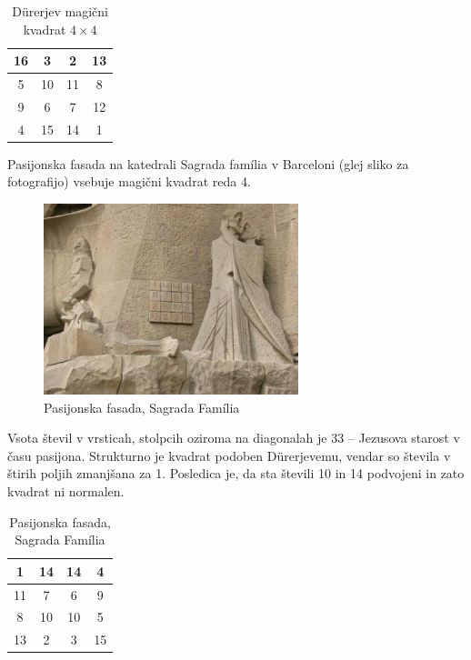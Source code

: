 \documentclass[a4paper,12pt]{article}
\theoremstyle{plain}
\theoremstyle{definition}
\theoremstyle{proof}
\begin{document}
\begin{table} [htp]
   \caption{Dürerjev magični kvadrat $4\times 4$}
   \centering
   \large
   
\begin{tabular}{|c|c|c|c|}
\hline
16 &  3 &  2 & 13 \\\hline
5 & 10 & 11 &  8 \\\hline
9 &  6 &  7 & 12 \\\hline
 4 & 15 & 14 &  1 \\\hline
\end{tabular}
\label{table:durer}
\end{table}



Pasijonska fasada na katedrali Sagrada família v Barceloni
(glej sliko \cite{fig:sagrada} za fotografijo) vsebuje magični kvadrat reda 4.

\begin{figure}[!ht]
   \centering
   \includegraphics{sagrada.png}
   \caption{Pasijonska fasada, Sagrada Família}
   \label{fig:sagrada}
 \end{figure}



Vsota števil v vrsticah, stolpcih oziroma na diagonalah je 33 -- Jezusova starost
v času pasijona. Strukturno je kvadrat podoben Dürerjevemu, vendar so števila
v štirih poljih zmanjšana za 1. Posledica je, da sta števili 10 in 14 podvojeni
in zato kvadrat ni normalen.
%

\begin{table} [htp]
   \caption{Pasijonska fasada, Sagrada Família}
   \centering
   \large
   
\begin{tabular}{|c|c|c|c|}
\hline
1 & 14 & 14 &  4 \\\hline
11 &  7 &  6 &  9 \\\hline
8 & 10 & 10 &  5 \\\hline
13 &  2 &  3 & 15 \\\hline
\end{tabular}
\label{table:sagrada}
\end{table}
\end{document}
